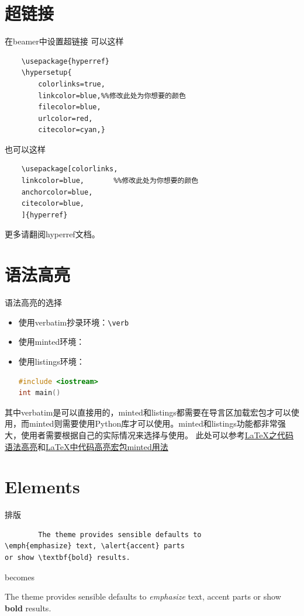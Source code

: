 \documentclass[9pt,UTF8]{ctexbeamer}
\begin{document}
\section{超链接}
\begin{frame}[fragile]{在beamer中设置超链接}
	可以这样
\begin{verbatim}
	\usepackage{hyperref}
	\hypersetup{
		colorlinks=true,
		linkcolor=blue,%%修改此处为你想要的颜色
		filecolor=blue,      
		urlcolor=red,
		citecolor=cyan,}
\end{verbatim}
也可以这样
\begin{verbatim}
	\usepackage[colorlinks,
	linkcolor=blue,       %%修改此处为你想要的颜色
	anchorcolor=blue,  
	citecolor=blue,       
	]{hyperref}
\end{verbatim}
更多请翻阅hyperref文档。
\end{frame}

\section{语法高亮}
\begin{frame}[fragile]{语法高亮的选择}
	\begin{itemize}
		\item 使用verbatim抄录环境：\verb|\verb|
		
		\item 使用minted环境：
		
		\item 使用listings环境：
		\begin{lstlisting}[language=c++]
#include <iostream>
int main()
		\end{lstlisting}
	\end{itemize}
其中verbatim是可以直接用的，minted和listings都需要在导言区加载宏包才可以使用，而minted则需要使用Python库才可以使用。minted和listings功能都非常强大，使用者需要根据自己的实际情况来选择与使用。
此处可以参考\href{https://www.latexstudio.net/archives/5900.html}{LaTeX之代码语法高亮}和\href{https://blog.csdn.net/xenonhu/article/details/88978672}{LaTeX中代码高亮宏包minted用法}
\end{frame}

\section{Elements}

\begin{frame}[fragile]{排版}
      \begin{verbatim}
      	The theme provides sensible defaults to
\emph{emphasize} text, \alert{accent} parts
or show \textbf{bold} results.
\end{verbatim}

  \begin{center}
  	becomes
  \end{center}

  The theme provides sensible defaults to \emph{emphasize} text,
  \alert{accent} parts or show \textbf{bold} results.
\end{frame}
\end{document}
